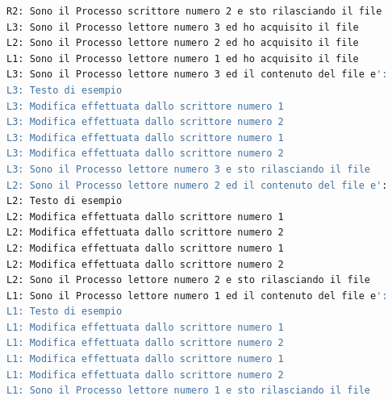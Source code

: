 \begin{lstlisting}[language=Bash]
R2: Sono il Processo scrittore numero 2 e sto rilasciando il file
L3: Sono il Processo lettore numero 3 ed ho acquisito il file
L2: Sono il Processo lettore numero 2 ed ho acquisito il file
L1: Sono il Processo lettore numero 1 ed ho acquisito il file
L3: Sono il Processo lettore numero 3 ed il contenuto del file e':
L3: Testo di esempio
L3: Modifica effettuata dallo scrittore numero 1
L3: Modifica effettuata dallo scrittore numero 2
L3: Modifica effettuata dallo scrittore numero 1
L3: Modifica effettuata dallo scrittore numero 2
L3: Sono il Processo lettore numero 3 e sto rilasciando il file
L2: Sono il Processo lettore numero 2 ed il contenuto del file e':
L2: Testo di esempio
L2: Modifica effettuata dallo scrittore numero 1
L2: Modifica effettuata dallo scrittore numero 2
L2: Modifica effettuata dallo scrittore numero 1
L2: Modifica effettuata dallo scrittore numero 2
L2: Sono il Processo lettore numero 2 e sto rilasciando il file
L1: Sono il Processo lettore numero 1 ed il contenuto del file e':
L1: Testo di esempio
L1: Modifica effettuata dallo scrittore numero 1
L1: Modifica effettuata dallo scrittore numero 2
L1: Modifica effettuata dallo scrittore numero 1
L1: Modifica effettuata dallo scrittore numero 2
L1: Sono il Processo lettore numero 1 e sto rilasciando il file
\end{lstlisting}
